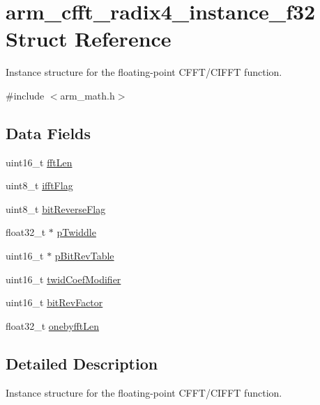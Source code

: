 \hypertarget{structarm__cfft__radix4__instance__f32}{\section{arm\-\_\-cfft\-\_\-radix4\-\_\-instance\-\_\-f32 Struct Reference}
\label{structarm__cfft__radix4__instance__f32}
}


Instance structure for the floating-\/point C\-F\-F\-T/\-C\-I\-F\-F\-T function.  




{\ttfamily \#include $<$arm\-\_\-math.\-h$>$}

\subsection*{Data Fields}
\begin{DoxyCompactItemize}
\item 
uint16\-\_\-t \hyperlink{structarm__cfft__radix4__instance__f32_ab8db3bbe7c61e6bb8ca2a55e3446e11a}{fft\-Len}
\item 
uint8\-\_\-t \hyperlink{structarm__cfft__radix4__instance__f32_ad6ca6e223f986ebfd94c5ee1e410aa73}{ifft\-Flag}
\item 
uint8\-\_\-t \hyperlink{structarm__cfft__radix4__instance__f32_a09a221a818c6d0e064557a99e2fe9a8b}{bit\-Reverse\-Flag}
\item 
float32\-\_\-t $\ast$ \hyperlink{structarm__cfft__radix4__instance__f32_aca581481fccdff0f557f54a3ef20d967}{p\-Twiddle}
\item 
uint16\-\_\-t $\ast$ \hyperlink{structarm__cfft__radix4__instance__f32_a46a2fb328199897af100fea0bfdf59aa}{p\-Bit\-Rev\-Table}
\item 
uint16\-\_\-t \hyperlink{structarm__cfft__radix4__instance__f32_afe772e5b5001c9d8e85032115a8df5bf}{twid\-Coef\-Modifier}
\item 
uint16\-\_\-t \hyperlink{structarm__cfft__radix4__instance__f32_a33386d95319dc3ee7097b3a8e52e01ec}{bit\-Rev\-Factor}
\item 
float32\-\_\-t \hyperlink{structarm__cfft__radix4__instance__f32_acf295a7b97b7d48a9cae4d1ab5ed00f6}{onebyfft\-Len}
\end{DoxyCompactItemize}


\subsection{Detailed Description}
Instance structure for the floating-\/point C\-F\-F\-T/\-C\-I\-F\-F\-T function. 

